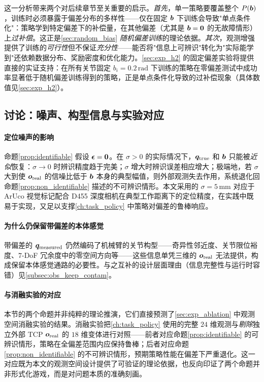 这一分析带来两个对后续章节至关重要的启示。\emph{首先}，单一策略要覆盖整个 $P(\bm{b})$，训练时必须暴露于偏差分布的多样性——仅在固定 $\bm{b}$ 下训练会导致"单点条件化"：策略学到特定偏差下的补偿量，在其他偏差（尤其是 $\bm{b}=\bm{0}$ 的无故障情形）上\emph{过补偿}。这正是\cref{sec:random_bias} \emph{随机偏差训练}的理论依据。\emph{其次}，观测增强提供了训练的\emph{可行性}但不保证\emph{充分性}——能否将"信息上可辨识"转化为"实际能学到"还依赖数据分布、奖励密度和优化能力。\cref{sec:exp_h2} 的固定偏差实验将提供直接的实证支持：在所有关节固定 $b_i = 0.2\,\text{rad}$ 下训练的策略在零偏差测试中成功率显著低于随机偏差训练得到的策略，正是单点条件化导致的过补偿现象（具体数值见\cref{sec:exp_h2}）。

\subsection{讨论：噪声、构型信息与实验对应}\label{subsec:observability_discussion}

\paragraph{定位噪声的影响} 命题\ref{prop:identifiable} 假设 $\bm{\epsilon} = \bm{0}$。在 $\sigma > 0$ 的实际情况下，$\bm{q}_{\text{true}}$ 和 $\bm{b}$ 只能被\emph{近似}恢复：$\sigma \to 0$ 时辨识精度趋于完美；$\sigma$ 增大时辨识误差相应增大；极端地，若 $\sigma$ 大到使 $\bm{o}_{\text{real}}$ 的信噪比低于 $\bm{b}$ 本身的典型幅值，则外部观测失去作用，系统退化回命题\ref{prop:non_identifiable} 描述的不可辨识情形。本文采用的 $\sigma = 5$\,mm 对应于 ArUco 视觉标记配合 D455 深度相机在典型工作距离下的定位精度，在实践中既易于实现，又足以支撑\cref{ch:task_policy} 中策略对偏差的鲁棒响应。

\paragraph{为什么仍保留带偏差的本体感觉} 带偏差的 $\bm{q}_{\text{measured}}$ 仍然编码了机械臂的关节构型——奇异性邻近度、关节限位裕度、$7$-DoF 冗余度中的零空间方向等——这些信息单凭三维的 $\bm{o}_{\text{real}}$ 无法提供，构成保留本体感觉通路的必要性。与之互补的设计层面理由（信息完整性与运行时容错）见\cref{subsec:obs_keep_contam}。

\paragraph{与消融实验的对应} 本节的两个命题并非纯粹的理论推演，它们直接预测了\cref{sec:exp_ablation} 中观测空间消融实验的结果。消融实验把\cref{ch:task_policy} 使用的完整 $24$ 维观测与\emph{剔除}独立外部 TCP $\bm{o}_\text{real}$ 的 $18$ 维变体进行对照——前者对应命题\ref{prop:identifiable} 的可辨识情形，策略在全偏差范围内应保持鲁棒；后者对应命题\ref{prop:non_identifiable} 的不可辨识情形，预期策略性能在偏差下严重退化。这一对应既为本文的观测空间设计提供了可验证的理论依据，也反向印证了两个命题并非形式化游戏，而是对问题本质的准确刻画。


